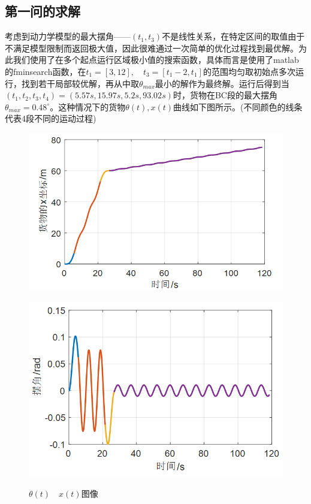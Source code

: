 \documentclass[withoutpreface,bwprint]{cumcmthesis} %
\begin{document}
\subsection{第一问的求解}
考虑到动力学模型的最大摆角——$(t_1,t_3)$不是线性关系，在特定区间的取值由于不满足模型限制而返回极大值，因此很难通过一次简单的优化过程找到最优解。为此我们使用了在多个起点运行区域极小值的搜索函数，具体而言是使用了matlab的fminsearch函数，在$t_1=[3,12],\quad t_3=[t_1-2,t_1]$的范围均匀取初始点多次运行，找到若干局部较优解，再从中取$\theta_{max}$最小的解作为最终解。运行后得到当$(t_1,t_2,t_3,t_4)=(5.57s,15.97s,5.2s,93.02s)$时，货物在BC段的最大摆角$\theta_{max}=0.48^{\circ}$。这种情况下的货物$\theta(t),x(t)$曲线如下图所示。(不同颜色的线条代表4段不同的运动过程)
\begin{figure}[!h]
    \centering
    \begin{minipage}[c]{0.48\textwidth}
        \centering
        \includegraphics[width=\textwidth]{p1x.png}
        \label{fig:sample-figure-a}
    \end{minipage}
    \begin{minipage}[c]{0.48\textwidth}
        \centering
        \includegraphics[width=\textwidth]{p1theta.png}
        \label{fig:sample-figure-b}
    \end{minipage}
    \caption{$\theta(t)\quad x(t)$图像}
    \label{fig:sample-figure}
\end{figure}
\end{document}
